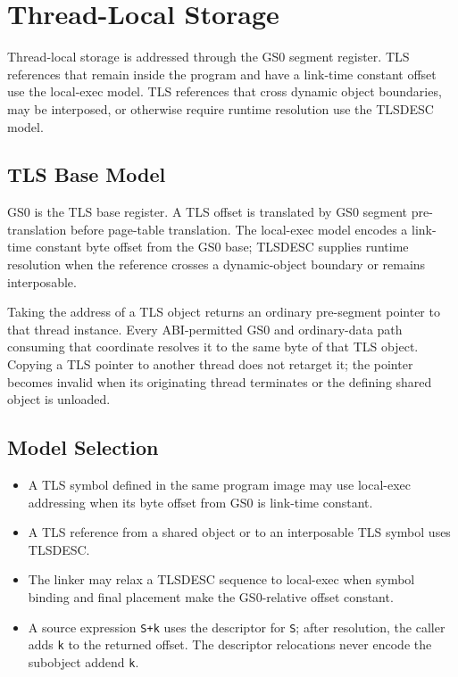 \documentclass[10pt,twoside]{article}
\begin{document}
\section{Thread-Local Storage}\label{page:thread-local-storage}
Thread-local storage is addressed through the GS0 segment register. TLS references that remain inside the program and have a link-time constant offset use the local-exec model. TLS references that cross dynamic object boundaries, may be interposed, or otherwise require runtime resolution use the TLSDESC model.
\subsection{TLS Base Model}
GS0 is the TLS base register. A TLS offset is translated by GS0 segment
pre-translation before page-table translation. The local-exec model encodes a
link-time constant byte offset from the GS0 base; TLSDESC supplies runtime
resolution when the reference crosses a dynamic-object boundary or remains
interposable.



Taking the address of a TLS object returns an ordinary pre-segment pointer to
that thread instance. Every ABI-permitted GS0 and ordinary-data path consuming
that coordinate resolves it to the same byte of that TLS object. Copying a TLS pointer to
another thread does not retarget it; the pointer becomes invalid when its
originating thread terminates or the defining shared object is unloaded.
\subsection{Model Selection}
\begin{itemize}
\item A TLS symbol defined in the same program image may use local-exec addressing when its byte offset from GS0 is link-time constant.
\item A TLS reference from a shared object or to an interposable TLS symbol uses TLSDESC.
\item The linker may relax a TLSDESC sequence to local-exec when symbol binding and final placement make the GS0-relative offset constant.
\item A source expression \texttt{S+k} uses the descriptor for \texttt{S}; after resolution, the caller adds \texttt{k} to the returned offset. The descriptor relocations never encode the subobject addend \texttt{k}.
\end{itemize}
\Needspace{1.8in}
\end{document}
